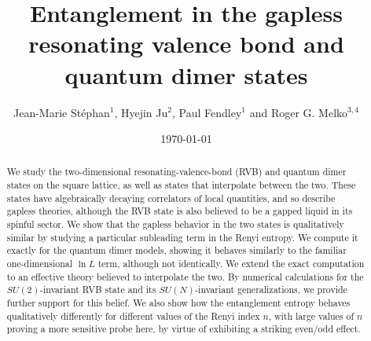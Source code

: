 \documentclass[11pt]{iopart}
\begin{document}
 
\title[Entanglement in  RVB and quantum dimer states]{Entanglement in the gapless resonating valence bond and quantum dimer states}
 
\author{Jean-Marie St\'ephan$^1$, Hyejin Ju$^2$, Paul Fendley$^1$ and Roger G. Melko$^{3,4}$}

\address{$^1$ Physics Department, University of Virginia, Charlottesville, VA 22904-4714}

\address{$^2$ Department of Physics, University of California, Santa Barbara, CA, 93106-9530}

\address{$^3$ Department of Physics and Astronomy, University of Waterloo, Ontario, N2L 3G1, Canada}

\address{$^4$ Perimeter Institute for Theoretical Physics, Waterloo, Ontario N2L 2Y5, Canada}



\date{\today}
\begin{abstract}

We study the two-dimensional resonating-valence-bond (RVB) and quantum dimer states on the square lattice,  as well as states that interpolate between the two. These states have algebraically decaying correlators of local quantities, and so describe gapless theories, although the RVB state is also believed to be a gapped liquid in its spinful sector. We show that the gapless behavior in the two states is qualitatively similar by studying a particular subleading term in the Renyi entropy. We compute it exactly for the quantum dimer models, showing   it behaves similarly to the familiar one-dimensional $\ln L$ term, although not identically. We extend the exact computation to an effective theory believed to interpolate the two. By numerical calculations for the $SU(2)$-invariant RVB state and its $SU(N)$-invariant generalizations, we provide further support for this belief.
We also show how the entanglement entropy behaves qualitatively differently for different values of the Renyi index $n$, with large values of $n$ proving a more sensitive probe here, by virtue of exhibiting a striking even/odd effect.


\end{abstract}
\maketitle

\tableofcontents
\end{document}
